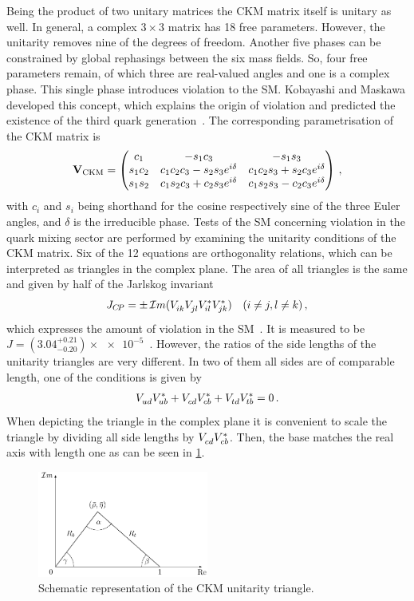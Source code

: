 Being the product of two unitary matrices the CKM matrix itself is unitary as
well. In general, a complex $3\times3$ matrix has 18 free parameters. However,
the unitarity removes nine of the degrees of freedom. Another five phases can
be constrained by global rephasings between the six mass fields. So, four free
parameters remain, of which three are real-valued angles and one is a complex
phase. This single phase introduces \CP violation to the SM. Kobayashi and
Maskawa developed this concept, which explains the origin of \CP violation and
predicted the existence of the third quark generation~\cite{Kobayashi:1973fv}.
The corresponding parametrisation of the CKM matrix is
\begin{align}
\mathbf{V}_{\text{CKM}} =
\begin{pmatrix}
c_1 & -s_1c_3 & -s_1s_3 \\
s_1c_2 & c_1c_2c_3 - s_2s_3e^{i\delta} & c_1c_2s_3 + s_2c_3e^{i\delta} \\
s_1s_2 & c_1s_2c_3 + c_2s_3e^{i\delta} & c_1s_2s_3 - c_2c_3e^{i\delta}
\end{pmatrix}
\,,
\end{align}
with $c_i$ and $s_i$ being shorthand for the cosine respectively sine of the
three Euler angles, and $\delta$ is the irreducible phase. Tests of the SM
concerning \CP violation in the quark mixing sector are performed by examining
the unitarity conditions of the CKM matrix. Six of the 12 equations are
orthogonality relations, which can be interpreted as triangles in the complex
plane. The area of all triangles is the same and given by half of the Jarlskog
invariant
\begin{align}
	J_{{C\!P}} = \pm\,\mathcal{I}m (V_{ik}^{}V_{jl}^{}V_{il}^{\ast}V_{jk}^{\ast}) \quad (i \neq j, l \neq k)\,,
\end{align}
which expresses the amount of \CP violation in the
SM~\cite{Jarlskog:1985ht,*Jarlskog:1985cw}. It is measured to be $J = (3.04
^{+0.21}_{-0.20}) \times\num{e-5}$~\cite{PDG2016}. However, the ratios of the
side lengths of the unitarity triangles are very different. In two of them all
sides are of comparable length, one of the conditions is given by
\begin{align}
	{\ensuremath{V_{{u}{d}}^{}}}{\ensuremath{V_{{u}{b}}^\ast}} + {V_{{c}{d}}^{}}{V_{{c}{b}}^\ast} + {V_{{t}{d}}^{}}{V_{{t}{b}}^\ast} = 0\,.
\end{align}
When depicting the triangle in the complex plane it is convenient to scale the
triangle by dividing all side lengths by ${V_{{c}{d}}^{}}{V_{{c}{b}}^\ast}$. Then, the base matches
the real axis with length one as can be seen in
\cref{fig:cpviolation:ckmtriangle}.
\begin{figure}[htb]
\centering
\includegraphics[width=0.5\textwidth]{03-CPViolation/tikz/pdf/CKMtriangle.pdf}
\caption{Schematic representation of the CKM unitarity triangle.}
\label{fig:cpviolation:ckmtriangle}
\end{figure}
